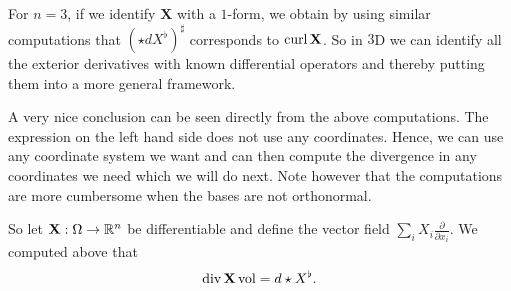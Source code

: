 \documentclass[../master_thesis.tex]{subfiles}
\begin{document}
For $n=3$, if we identify $\mathbf{X}$ with a $1$-form, 
we obtain by using similar computations 
that $(\star d X^\flat)^\sharp$ corresponds to  $\mathbf{\operatorname{curl}} \,\mathbf{X}$.
So in $3$D we can identify all the exterior derivatives with known differential
operators and thereby putting them into a more general framework.

A very nice conclusion can be seen directly from the above computations. The 
expression on the left hand side does not use any coordinates. Hence, 
we can use any coordinate system we want and can then compute the 
divergence in any coordinates we need which we will do next. Note however that the computations are
more cumbersome when the bases are not orthonormal.

So let $\mathbf{X}: \Omega \rightarrow \mathbb{R}^n$ be differentiable and define the
vector field $\sum_i X_i \frac{\partial}{\partial x_i}$. We computed above that 
\begin{align*}
    \operatorname{div} \mathbf{X} \operatorname{vol} = d \star X^\flat.
\end{align*}
\end{document}
